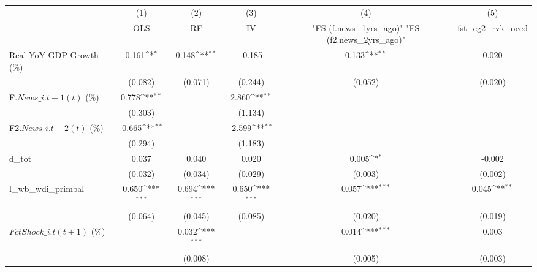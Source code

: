 {
\def\sym#1{\ifmmode^{#1}\else\(^{#1}\)\fi}
\begin{tabular}{l*{5}{c}}
\toprule
                    &\multicolumn{1}{c}{(1)}&\multicolumn{1}{c}{(2)}&\multicolumn{1}{c}{(3)}&\multicolumn{1}{c}{(4)}&\multicolumn{1}{c}{(5)}\\
                    &\multicolumn{1}{c}{OLS}&\multicolumn{1}{c}{RF}&\multicolumn{1}{c}{IV}&\multicolumn{1}{c}{ "FS (f.news\_1yrs\_ago)"  "FS (f2.news\_2yrs\_ago)" }&\multicolumn{1}{c}{fst\_eg2\_rvk\_oecd}\\
\midrule
Real YoY GDP Growth (\%)&       0.161\sym{*}  &       0.148\sym{**} &      -0.185         &       0.133\sym{**} &       0.020         \\
                    &     (0.082)         &     (0.071)         &     (0.244)         &     (0.052)         &     (0.020)         \\
\addlinespace
F.$ News\_{i.t-1}(t)$ (\%)&       0.778\sym{**} &                     &       2.860\sym{**} &                     &                     \\
                    &     (0.303)         &                     &     (1.134)         &                     &                     \\
\addlinespace
F2.$ News\_{i.t-2}(t)$ (\%)&      -0.665\sym{**} &                     &      -2.599\sym{**} &                     &                     \\
                    &     (0.294)         &                     &     (1.183)         &                     &                     \\
\addlinespace
d\_tot               &       0.037         &       0.040         &       0.020         &       0.005\sym{*}  &      -0.002         \\
                    &     (0.032)         &     (0.034)         &     (0.029)         &     (0.003)         &     (0.002)         \\
\addlinespace
l\_wb\_wdi\_primbal    &       0.650\sym{***}&       0.694\sym{***}&       0.650\sym{***}&       0.057\sym{***}&       0.045\sym{**} \\
                    &     (0.064)         &     (0.045)         &     (0.085)         &     (0.020)         &     (0.019)         \\
\addlinespace
$ FctShock\_{i.t}(t+1)$ (\%)&                     &       0.032\sym{***}&                     &       0.014\sym{***}&       0.003         \\
                    &                     &     (0.008)         &                     &     (0.005)         &     (0.003)         \\

\end{tabular}}

